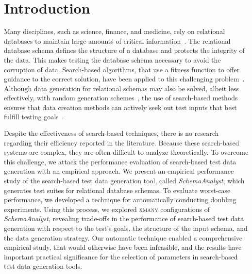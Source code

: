 
\vspace*{-.25in}
\section{Introduction}



Many disciplines, such as science, finance, and medicine, rely on relational databases to maintain large amounts of
critical information~\cite{kapfhammer2007}. The relational database schema defines the structure of a database and
protects the integrity of the data. This makes testing the database schema necessary to avoid the corruption of data.
Search-based algorithms, that use a fitness function to offer guidance to the correct solution, have been applied to
this challenging problem~\cite{Kapfhammer2013}. Although data generation for relational schemas may also be solved,
albeit less effectively, with random generation schemes~\cite{McMinn2015}, the use of search-based methods ensures that
data creation methods can actively seek out test inputs that best fulfill testing goals~\cite{McMinn2004a}.


Despite the effectiveness of search-based techniques, there is no research regarding their efficiency reported in the
literature. Because these search-based systems are complex, they are often difficult to analyze theoretically. To
overcome this challenge, we attack the performance evaluation of search-based test data generation with an empirical
approach. We present an empirical performance study of the search-based test data generation tool, called
\textit{SchemaAnalyst}, which generates test suites for relational database schemas. To evaluate worst-case performance,
we developed a technique for automatically conducting doubling experiments. Using this process, we explored
\textsc{xmany} configurations of \textit{SchemaAnalyst}, revealing trade-offs in the performance of search-based test
data generation with respect to the test’s goals, the structure of the input schema, and the data generation strategy.
Our automatic technique enabled a comprehensive empirical study, that would otherwise have been infeasible, and the
results have important practical significance for the selection of parameters in search-based test data generation
tools.

